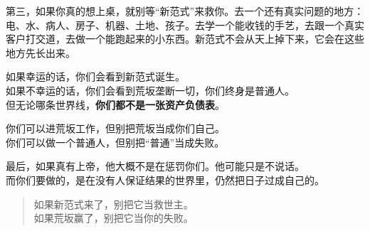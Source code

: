 第三，如果你真的想上桌，就别等``新范式''来救你。去一个还有真实问题的地方：电、水、病人、房子、机器、土地、孩子。去学一个能收钱的手艺，去跟一个真实客户打交道，去做一个能跑起来的小东西。新范式不会从天上掉下来，它会在这些地方先长出来。

如果幸运的话，你们会看到新范式诞生。\\
如果不幸运的话，你们会看到荒坂垄断一切，你们终身是普通人。\\
但无论哪条世界线，\textbf{你们都不是一张资产负债表}。

你们可以进荒坂工作，但别把荒坂当成你们自己。\\
你们可以做一个普通人，但别把``普通''当成失败。

最后，如果真有上帝，他大概不是在惩罚你们。他可能只是不说话。\\
而你们要做的，是在没有人保证结果的世界里，仍然把日子过成自己的。

\begin{quote}
如果新范式来了，别把它当救世主。\\
如果荒坂赢了，别把它当你的失败。
\end{quote}
